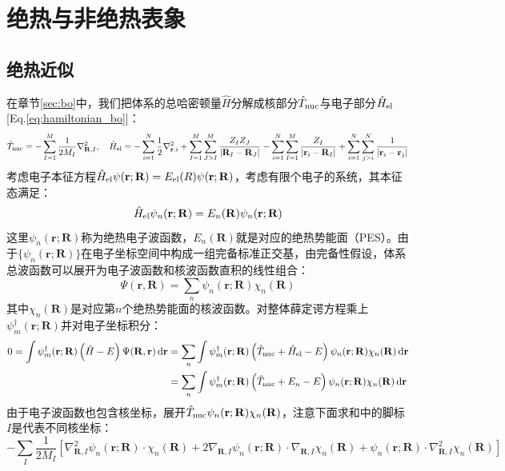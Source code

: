 \section{绝热与非绝热表象}
\subsection{绝热近似}\label{sec:jrjs}
在章节\ref{sec:bo}中，我们把体系的总哈密顿量$\hat{H}$分解成核部分$\hat{T}_{\rm nuc}$与电子部分$\hat{H}_{\rm el}$ [Eq.\eqref{eq:hamiltonian_bo}]：
\[\hat{T}_{\rm nuc}=-\sum_{I=1}^M\frac{1}{2M_I}\nabla^2_{\mathbf{R},I},\quad \hat{H}_{\rm el}=-\sum_{i=1}^N\frac{1}{2}\nabla^2_{\mathbf{r},i}+\sum_{I=1}^{M}\sum_{J>I}^{M}\frac{Z_{I}Z_{J}}{|\mathbf{R}_{I}-\mathbf{R}_{J}|}-\sum_{i=1}^{N}\sum_{I=1}^{M}\frac{Z_{I}}{|\mathbf{r}_{i}-\mathbf{R}_{I}|}+\sum_{i=1}^{N}\sum_{j>i}^{N}\frac{1}{|\mathbf{r}_{i}-\mathbf{r}_{j}|}\]
考虑电子本征方程$\hat{H}_{\rm el}\psi(\mathbf{r};\mathbf{R})=E_{\rm el}(R)\psi(\mathbf{r};\mathbf{R})$，考虑有限个电子的系统，其本征态满足：
\[\hat{H}_{\rm el}\psi_n(\mathbf{r};\mathbf{R})=E_n(\mathbf{R})\psi_n(\mathbf{r};\mathbf{R})\]
这里$\psi_n(\mathbf{r};\mathbf{R})$称为绝热电子波函数，$E_n(\mathbf{R})$就是对应的绝热势能面（PES）。由于$\{\psi_n(\mathbf{r};\mathbf{R})\}$在电子坐标空间中构成一组完备标准正交基，由完备性假设，体系总波函数可以展开为电子波函数和核波函数直积的线性组合：
\[\Psi(\mathbf{r},\mathbf{R})=\sum_n\psi_n(\mathbf{r};\mathbf{R})\chi_n(\mathbf{R})\]
其中$\chi_n(\mathbf{R})$是对应第$n$个绝热势能面的核波函数。对整体薛定谔方程乘上$\psi_m^{\dagger}(\mathbf{r};\mathbf{R})$并对电子坐标积分：
\begin{equation}\label{eq:bo_eom}
\begin{aligned}
0=\int\psi_m^{\dagger}(\mathbf{r};\mathbf{R})\left(\hat{H}-E\right)\Psi(\mathbf{R},\mathbf{r})\dd{\mathbf{r}}
&=\sum_n\int\psi_m^{\dagger}(\mathbf{r};\mathbf{R})\left(\hat{T}_{\rm nuc}+\hat{H}_{\rm el}-E\right)\psi_n(\mathbf{r};\mathbf{R})\chi_n(\mathbf{R})\dd{\mathbf{r}}\\
&=\sum_n\int\psi_m^{\dagger}(\mathbf{r};\mathbf{R})\left(\hat{T}_{\rm nuc}+E_n-E\right)\psi_n(\mathbf{r};\mathbf{R})\chi_n(\mathbf{R})\dd{\mathbf{r}}\\
\end{aligned}
\end{equation}
由于电子波函数也包含核坐标，展开$\hat{T}_{\rm nuc}\psi_n(\mathbf{r};\mathbf{R})\chi_n(\mathbf{R})$，注意下面求和中的脚标$I$是代表不同核坐标：
\[-\sum_I\frac{1}{2M_I}\left[\nabla_{\mathbf{R},I}^2\psi_n(\mathbf{r};\mathbf{R})\cdot\chi_n(\mathbf{R})+2\nabla_{\mathbf{R},I}\psi_n(\mathbf{r};\mathbf{R})\cdot\nabla_{\mathbf{R},I}\chi_n(\mathbf{R})+\psi_n(\mathbf{r};\mathbf{R})\cdot\nabla^2_{\mathbf{R},I}\chi_n(\mathbf{R})\right]\]
